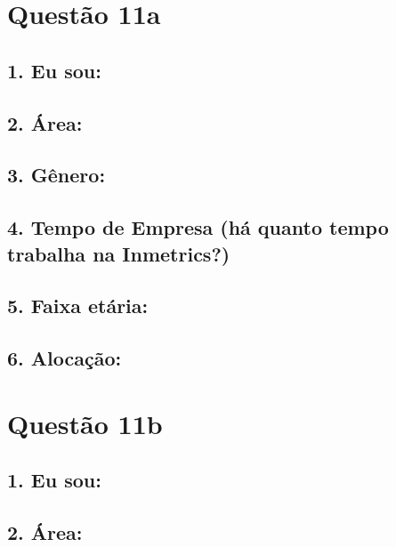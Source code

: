 \documentclass[]{book}
\begin{document}
\hypertarget{questao-11a}{%
\section{Questão 11a}\label{questao-11a}}

\hypertarget{eu-sou-12}{%
\subsection{1. Eu sou:}\label{eu-sou-12}}

\hypertarget{area-12}{%
\subsection{2. Área:}\label{area-12}}

\hypertarget{genero-12}{%
\subsection{3. Gênero:}\label{genero-12}}

\hypertarget{tempo-de-empresa-ha-quanto-tempo-trabalha-na-inmetrics-12}{%
\subsection{4. Tempo de Empresa (há quanto tempo trabalha na Inmetrics?)}\label{tempo-de-empresa-ha-quanto-tempo-trabalha-na-inmetrics-12}}

\hypertarget{faixa-etaria-12}{%
\subsection{5. Faixa etária:}\label{faixa-etaria-12}}

\hypertarget{alocacao-12}{%
\subsection{6. Alocação:}\label{alocacao-12}}

\hypertarget{questao-11b}{%
\section{Questão 11b}\label{questao-11b}}

\hypertarget{eu-sou-13}{%
\subsection{1. Eu sou:}\label{eu-sou-13}}

\hypertarget{area-13}{%
\subsection{2. Área:}\label{area-13}}
\end{document}
